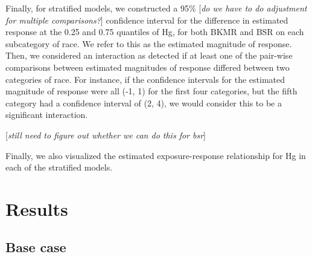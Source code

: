 \documentclass[12pt, twoside]{amherstthesis}
\begin{document}
Finally, for stratified models, we constructed a 95\% {[}\emph{do we have to do adjustment for multiple comparisons?}{]} confidence interval for the difference in estimated response at the 0.25 and 0.75 quantiles of Hg, for both BKMR and BSR on each subcategory of race. We refer to this as the estimated magnitude of response. Then, we considered an interaction as detected if at least one of the pair-wise comparisons between estimated magnitudes of response differed between two categories of race. For instance, if the confidence intervals for the estimated magnitude of response were all (-1, 1) for the first four categories, but the fifth category had a confidence interval of (2, 4), we would consider this to be a significant interaction.

{[}\emph{still need to figure out whether we can do this for bsr}{]}

Finally, we also visualized the estimated exposure-response relationship for Hg in each of the stratified models.

\hypertarget{results}{%
\section{Results}\label{results}}

\hypertarget{base-case}{%
\subsection{Base case}\label{base-case}}
\end{document}
